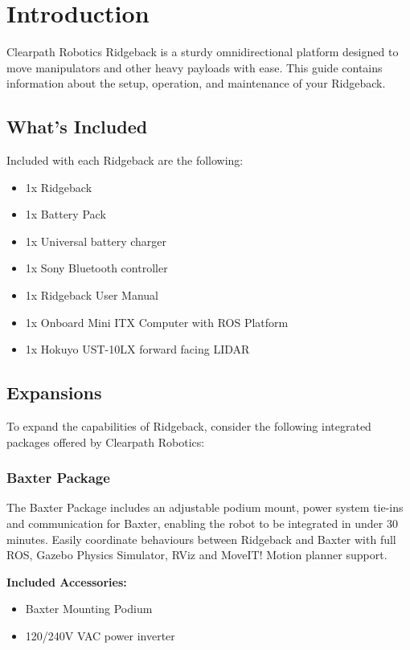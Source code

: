 \documentclass[]{clearpath-latex/clearpath-manual}
\begin{document}
\tableofcontents

\section{Introduction}
Clearpath Robotics Ridgeback is a sturdy omnidirectional platform designed to move manipulators and other heavy payloads with ease. This guide contains information about the setup, operation, and maintenance of your Ridgeback.

\subsection{What's Included}

Included with each Ridgeback are the following:

\begin{itemize}[nolistsep]
	\item 1x Ridgeback 
	\item 1x Battery Pack
	\item 1x Universal battery charger
	\item 1x Sony Bluetooth controller
	\item 1x Ridgeback User Manual
	\item 1x Onboard Mini ITX Computer with ROS Platform
	\item 1x Hokuyo UST-10LX forward facing LIDAR
\end{itemize}

\subsection{Expansions}

To expand the capabilities of Ridgeback, consider the following integrated packages offered by Clearpath Robotics:

\subsubsection{Baxter Package}

The Baxter Package includes an adjustable podium mount, power system tie-ins and communication for Baxter, enabling the robot to be integrated in under 30 minutes. Easily coordinate behaviours between Ridgeback and Baxter with full ROS, Gazebo Physics Simulator, RViz and MoveIT! Motion planner support.

\textbf{Included Accessories:}
\begin{itemize}[nolistsep]
	\item Baxter Mounting Podium
	\item 120/240V VAC power inverter
\end{itemize}
\end{document}
